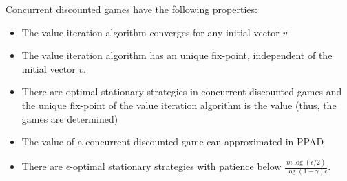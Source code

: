 \begin{lemma}\label{cor:long}
Concurrent discounted games have the following properties:
\begin{itemize}
\item The value iteration algorithm converges for any initial vector $v$
\item The value iteration algorithm has an unique fix-point, independent of the initial vector $v$.
\item There are optimal stationary strategies in concurrent discounted games and the unique fix-point of the value iteration algorithm is the value (thus, the games are determined)
\item The value of a concurrent discounted game can approximated in PPAD
\item There are $\epsilon$-optimal stationary strategies with patience below $\frac{m\log(\epsilon/2)}{\log(1-\gamma)\epsilon}$.
\end{itemize}
\end{lemma}
